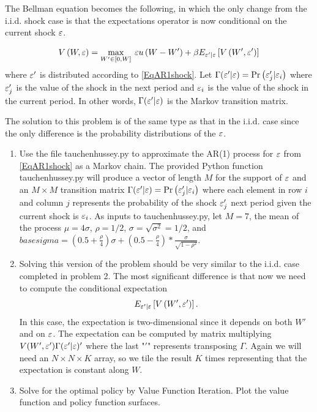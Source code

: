 The Bellman equation becomes the following, in which the only change from the i.i.d. shock case is that the expectations operator is now conditional on the current shock $\varepsilon$.

\begin{equation*}
   V\left(W,\varepsilon\right) = \max_{W'\in[0,W]}\: \varepsilon u\left(W - W'\right) + \beta E_{\varepsilon'|\varepsilon}\left[V\left(W',\varepsilon'\right)\right]
\end{equation*}
where $\varepsilon'$ is distributed according to \eqref{EqAR1shock}. Let $\Gamma(\varepsilon'|\varepsilon)=\text{Pr}\left(\varepsilon_j'|\varepsilon_i\right)$ where $\varepsilon_j'$ is the value of the shock in the next period and $\varepsilon_i$ is the value of the shock in the current period.  In other words, $\Gamma(\varepsilon' | \varepsilon)$ is the Markov transition matrix.

The solution to this problem is of the same type as that in the i.i.d. case since the only difference is the probability distributions of the $\varepsilon$.

\begin{problem}
\begin{enumerate}
   \item Use the file tauchenhussey.py to approximate the AR(1) process for $\varepsilon$ from \eqref{EqAR1shock} as a Markov chain. The provided Python function tauchenhussey.py will produce a vector of length $M$ for the support of $\varepsilon$ and an $M\times M$ transition matrix $\Gamma(\varepsilon'|\varepsilon)=\text{Pr}\left(\varepsilon_j'|\varepsilon_i\right)$ where each element in row $i$ and column $j$ represents the probability of the shock $\varepsilon_j'$ next period given the current shock is $\varepsilon_i$. As inputs to tauchenhussey.py, let $M=7$, the mean of the process $\mu=4\sigma$, $\rho = 1/2$, $\sigma=\sqrt{\sigma^2}=1/2$, and $basesigma=(0.5+\frac{\rho}{4})\sigma + (0.5 - \frac{\rho}{4})*\frac{\sigma}{\sqrt{1-\rho^2}}$.

  \item Solving this version of the problem should be very similar to the i.i.d. case completed in problem 2.  The most significant difference is that now we need to compute the conditional expectation
      \begin{equation}
      E_{\varepsilon'|\varepsilon}\left[V\left(W',\varepsilon'\right)\right].
      \end{equation}
      In this case, the expectation is two-dimensional since it depends on both $W'$ and on $\varepsilon$.  The expectation can be computed by matrix multiplying $V(W',\varepsilon')\Gamma(\varepsilon' | \varepsilon)'$ where the last "$'$" represents transposing $\Gamma$.  Again we will need an $N\times N\times K$ array, so we tile the result $K$ times representing that the expectation is constant along $W$.

  \item Solve for the optimal policy by Value Function Iteration.  Plot the value function and policy function surfaces.


\end{enumerate}
\end{problem} 